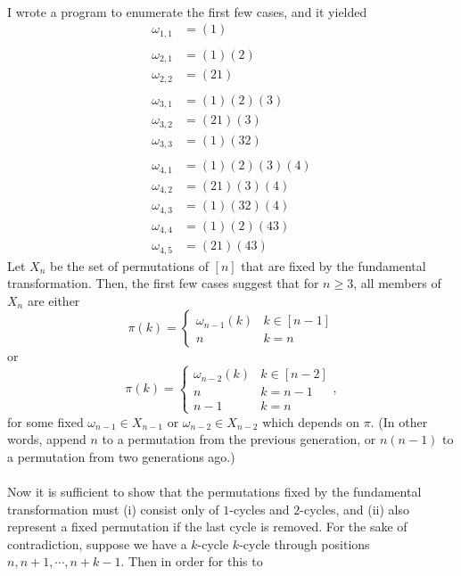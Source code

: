 \documentclass{article}
\newenvironment{solution}[1][Solution.]{\begin{trivlist}
\item[\hskip \labelsep {\bfseries #1}]}{\end{trivlist}}
\begin{document}
\begin{solution} \text{} \\
  I wrote a program to enumerate the first few cases, and it yielded \begin{align*}
    \omega_{1,1} &= (1) \\
    &\\
    \omega_{2,1} &= (1) (2) \\
    \omega_{2,2} &= (2 1) \\
    &\\
    \omega_{3,1} &= (1) (2) (3) \\
    \omega_{3,2} &= (2 1) (3) \\
    \omega_{3,3} &= (1) (3 2) \\
    &\\
    \omega_{4,1} &= (1) (2) (3) (4) \\
    \omega_{4,2} &= (2 1) (3) (4) \\
    \omega_{4,3} &= (1) (3 2) (4) \\
    \omega_{4,4} &= (1) (2) (4 3) \\
    \omega_{4,5} &= (2 1) (4 3)
  \end{align*}
  Let $X_n$ be the set of permutations of $[n]$ that are fixed by the
  fundamental transformation. Then, the first few cases suggest that for
  $n \geq 3$, all members of $X_n$ are either
  \[
    \pi(k) = \begin{cases}
      \omega_{n-1}(k) & k \in [n - 1] \\
      n         & k = n
    \end{cases}
  \] or \[
    \pi(k) = \begin{cases}
      \omega_{n - 2}(k) & k \in [n - 2] \\
      n                 & k = n - 1 \\
      n - 1             & k = n
    \end{cases},
  \]
  for some fixed $\omega_{n-1} \in X_{n-1}$ or $\omega_{n-2} \in X_{n-2}$ which
  depends on $\pi$.
  (In other words, append $n$ to a permutation from the previous generation, or
  $n(n-1)$ to a permutation from two generations ago.)
  \\~\\
  Now it is sufficient to show that the permutations fixed by the fundamental
  transformation must
    (i) consist only of $1$-cycles and $2$-cycles, and
    (ii) also represent a fixed permutation if the last cycle is removed.
  For the sake of contradiction, suppose we have a $k$-cycle
  $k$-cycle through positions $n, n+1, \cdots, n+k-1$. Then in order for this to

\end{solution}
\end{document}
